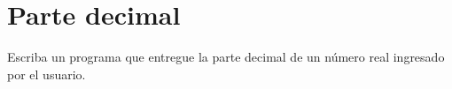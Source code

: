 \section{Parte decimal}

Escriba un programa que entregue la parte decimal de un número real
ingresado por el usuario.
